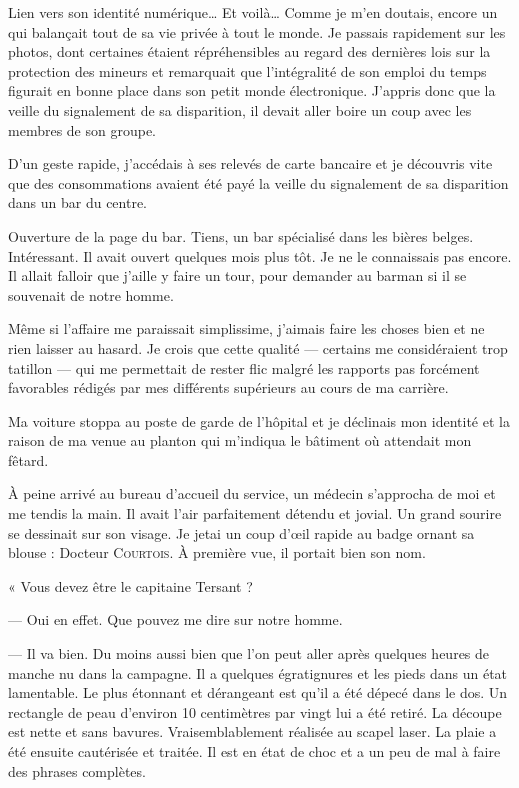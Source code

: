 Lien vers son identité numérique… Et voilà… Comme je m'en doutais, encore un qui balançait tout de sa vie privée à tout
le monde. Je passais rapidement sur les photos, dont certaines étaient répréhensibles au regard des dernières lois sur
la protection des mineurs et remarquait que l'intégralité de son emploi du temps figurait en bonne place dans son petit
monde électronique. J'appris donc que la veille du signalement de sa disparition, il devait aller boire un coup avec
les membres de son groupe.

D'un geste rapide, j'accédais à ses relevés de carte bancaire et je découvris vite que des consommations avaient été
payé la veille du signalement de sa disparition dans un bar du centre.

Ouverture de la page du bar. Tiens, un bar spécialisé dans les bières belges. Intéressant. Il avait ouvert quelques
mois plus tôt. Je ne le connaissais pas encore. Il allait falloir que j'aille y faire un tour, pour demander au barman
si il se souvenait de notre homme.

Même si l'affaire me paraissait simplissime, j'aimais faire les choses bien et ne rien laisser au hasard. Je crois que
cette qualité — certains me considéraient trop tatillon — qui me permettait de rester flic malgré les rapports pas
forcément favorables rédigés par mes différents supérieurs au cours de ma carrière.

Ma voiture stoppa au poste de garde de l'hôpital et je déclinais mon identité et la raison de ma venue au planton qui
m'indiqua le bâtiment où attendait mon fêtard.

À peine arrivé au bureau d'accueil du service, un médecin s'approcha de moi et me tendis la main.
Il avait l'air parfaitement détendu et jovial. Un grand sourire se dessinait sur son visage. Je jetai un coup d'œil
rapide au badge ornant sa blouse : Docteur \textsc{Courtois}. À première vue, il portait bien son nom.

« Vous devez être le capitaine Tersant ?

— Oui en effet. Que pouvez me dire sur notre homme.

— Il va bien. Du moins aussi bien que l'on peut aller après quelques heures de manche nu dans la campagne. Il a
quelques égratignures et les pieds dans un état lamentable. Le plus étonnant et dérangeant est qu'il a été dépecé 
dans le dos. Un rectangle de peau d'environ 10 centimètres par vingt lui a été retiré. La découpe est nette et sans 
bavures. Vraisemblablement réalisée au scapel laser. La plaie a été ensuite cautérisée et traitée. Il est en état de 
choc et a un peu de mal à faire des phrases complètes.

